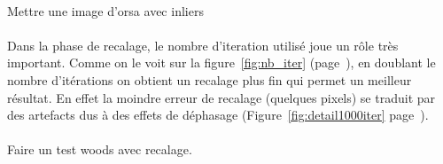 \documentclass[a4paper,10pt]{report}
\begin{document}
\paragraph{}
Mettre une image d'orsa avec inliers

\paragraph{}
Dans la phase de recalage, le nombre d'iteration utilisé joue un rôle très important. Comme on le voit sur 
la figure~\ref{fig:nb_iter} (page~\pageref{fig:nb_iter}), en doublant le nombre d'itérations on obtient un 
recalage plus fin qui permet un meilleur résultat. En effet la moindre erreur de recalage (quelques pixels) 
se traduit par des artefacts dus à des effets de déphasage (Figure~\ref{fig:detail1000iter} page~\pageref{fig:1000iter}).
\\\\
Faire un test woods avec recalage. 
\end{document}
